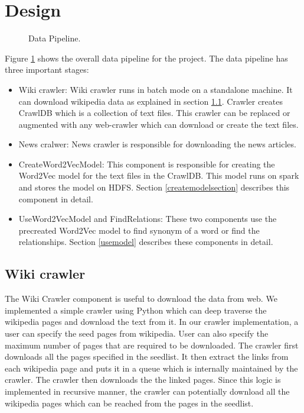 \section{Design} \label{designsection}

\begin{figure}[htbp]
\centering
{}
\caption{Data Pipeline.}
\label{fig:datapipeline}
\end{figure}

Figure \ref{fig:datapipeline} shows the overall data pipeline for the
project. The data pipeline has three important stages:
\begin{itemize}
\item Wiki crawler: Wiki crawler runs in batch mode on a standalone machine. It
 can download wikipedia data as explained in section \ref{wikicrawlersection}.
 Crawler creates CrawlDB which is a collection of text files. This crawler
 can be replaced or augmented with any web-crawler which can download or
 create the text files.

 \item News cralwer: News crawler is responsible for downloading the news
 articles.

\item CreateWord2VecModel: This component is responsible for creating the
Word2Vec model for the text files in the CrawlDB. This model runs on spark
and stores the model on HDFS. Section \ref{createmodelsection} describes this
 component in detail.

\item UseWord2VecModel and FindRelations: These two components use the
precreated Word2Vec model to find synonym of a word or find the relationships.
Section \ref{usemodel} describes these components in detail.
\end{itemize}

\subsection{Wiki crawler} \label{wikicrawlersection}
The Wiki Crawler component is useful to download the data from web. We
implemented
 a simple crawler using Python which can deep traverse the wikipedia pages
 and download the text from it. In our crawler implementation, a user can
 specify the seed pages from wikipedia. User can also specify the maximum
 number of pages that are required to be downloaded. The crawler first
 downloads all the pages specified in the seedlist. It then extract the links
  from each wikipedia page and puts it in a queue which is internally
  maintained by the crawler. The crawler then downloads the the linked pages.
   Since this logic is implemented in recursive manner, the crawler can
   potentially download all the wikipedia pages which can be reached from the
   pages in the seedlist.


